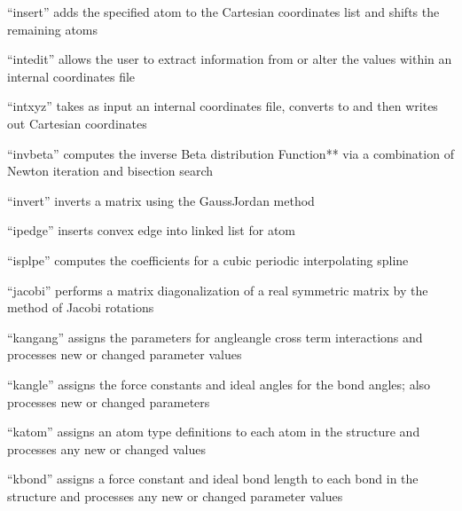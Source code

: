 \documentclass[letterpaper,11pt,english]{sphinxmanual}
\begin{document}
“insert” adds the specified atom to the Cartesian coordinates list and shifts the remaining atoms


“intedit” allows the user to extract information from or alter the values within an internal coordinates file


“intxyz” takes as input an internal coordinates file, converts to and then writes out Cartesian coordinates


“invbeta” computes the inverse Beta distribution Function** via a combination of Newton iteration and bisection search


“invert” inverts a matrix using the Gauss\sphinxhyphen{}Jordan method


“ipedge” inserts convex edge into linked list for atom


“isplpe” computes the coefficients for a cubic periodic interpolating spline


“jacobi” performs a matrix diagonalization of a real symmetric matrix by the method of Jacobi rotations


“kangang” assigns the parameters for angle\sphinxhyphen{}angle cross term interactions and processes new or changed parameter values


“kangle” assigns the force constants and ideal angles for the bond angles; also processes new or changed parameters


“katom” assigns an atom type definitions to each atom in the structure and processes any new or changed values


“kbond” assigns a force constant and ideal bond length to each bond in the structure and processes any new or changed parameter values

\end{document}
